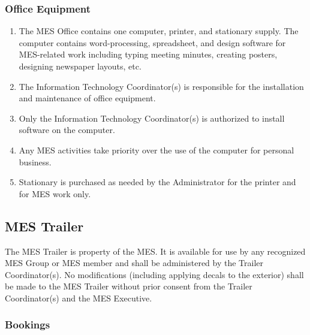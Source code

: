 \hypertarget{office-equipment}{%
 \subsubsection{Office Equipment}
 \label{office-equipment}}
\begin{enumerate}
 \item
  The MES Office contains one computer, printer, and stationary supply.
  The computer contains word-processing, spreadsheet, and design
  software for MES-related work including typing meeting minutes,
  creating posters, designing newspaper layouts, etc.
 \item
  The Information Technology Coordinator(s) is responsible for the
  installation and maintenance of office equipment.
 \item
  Only the Information Technology Coordinator(s) is authorized to
  install software on the computer.
 \item
  Any MES activities take priority over the use of the computer for
  personal business.
 \item
  Stationary is purchased as needed by the Administrator for the printer
  and for MES work only.

\end{enumerate}

\hypertarget{mes-trailer}{%
 \subsection{MES Trailer}
 \label{mes-trailer}}
The MES Trailer is property of the MES. It is available for use by any
recognized MES Group or MES member and shall be administered by the
Trailer Coordinator(s). No modifications (including applying decals to
the exterior) shall be made to the MES Trailer without prior consent
from the Trailer Coordinator(s) and the MES Executive.

\hypertarget{bookings}{%
 \subsubsection{Bookings}
 \label{bookings}}

